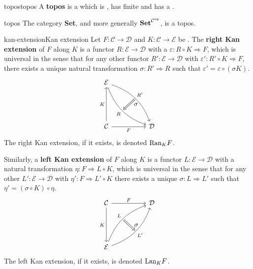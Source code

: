 \begin{topic}{topos}{topos}
    A \textbf{topos} is a  which is , has finite  and has a .
\end{topic}

\begin{example}{topos}
    The category \textbf{Set}, and more generally $\textbf{Set}^{\mathcal{C}^\textup{op}}$, is a topos.
\end{example}

\begin{topic}{kan-extension}{Kan extension}
    Let $F : \mathcal{C} \to \mathcal{D}$ and $K : \mathcal{C} \to \mathcal{E}$ be . The \textbf{right Kan extension} of $F$ along $K$ is a functor $R : \mathcal{E} \to \mathcal{D}$ with a  $\varepsilon : R \circ K \Rightarrow F$, which is universal in the sense that for any other functor $R' : \mathcal{E} \to \mathcal{D}$ with $\varepsilon' : R' \circ K \Rightarrow F$, there exists a unique natural transformation $\sigma : R' \Rightarrow R$ such that $\varepsilon' = \varepsilon \circ (\sigma K)$.
    \[ \begin{tikzcd}[row sep=5em, column sep=5em] \mathcal{E} \arrow[swap, bend right=25]{dr}[name=R1]{R} \arrow[bend left=25]{dr}[name=R2]{R'} \\ \mathcal{C} \arrow[swap]{r}{F} \arrow{u}{K} & \mathcal{D} \arrow[shorten <=2pt,shorten >=2pt,Rightarrow,to path={(R2) -- node[label=right:$\sigma$] {} (R1)}]{}\end{tikzcd} \]
    The right Kan extension, if it exists, is denoted $\textup{Ran}_K F$.

    Similarly, a \textbf{left Kan extension} of $F$ along $K$ is a functor $L : \mathcal{E} \to \mathcal{D}$ with a natural transformation $\eta : F \Rightarrow L \circ K$, which is universal in the sense that for any other $L' : \mathcal{E} \to \mathcal{D}$ with $\eta' : F \Rightarrow L' \circ K$ there exists a unique $\sigma : L \Rightarrow L'$ such that $\eta' = (\sigma \circ K) \circ \eta$.
    \[ \begin{tikzcd}[row sep=5em, column sep=5em] \mathcal{C} \arrow{r}{F} \arrow[swap]{d}{K} & \mathcal{D} \\ \mathcal{E} \arrow[bend left=25]{ur}[name=L1]{L} \arrow[swap, bend right=25]{ur}[name=L2]{L'} \arrow[shorten <=2pt,shorten >=2pt,Rightarrow,to path={(L1) -- node[label=right:$\sigma$] {} (L2)}]{} \end{tikzcd} \]
    The left Kan extension, if it exists, is denoted $\textup{Lan}_K F$.
\end{topic}

